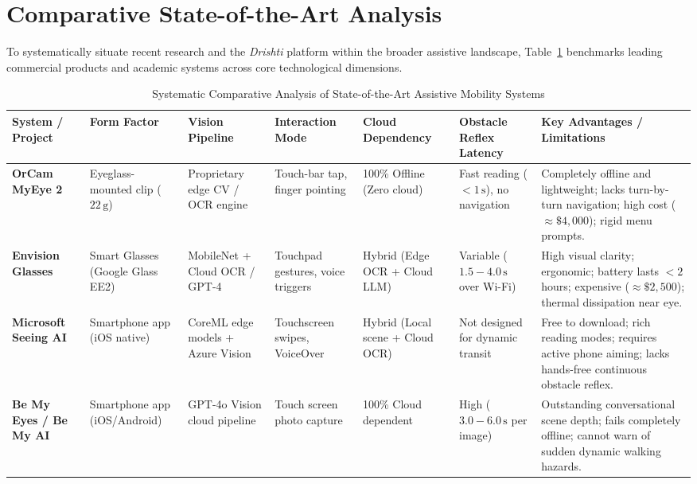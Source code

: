 \documentclass[10pt,twocolumn]{article}
\begin{document}
\section{Comparative State-of-the-Art Analysis}
\label{sec:comparative}

To systematically situate recent research and the \textit{Drishti} platform within the broader assistive landscape, Table~\ref{tab:comparison} benchmarks leading commercial products and academic systems across core technological dimensions.

\begin{table}[t]
\centering
\small
\caption{Systematic Comparative Analysis of State-of-the-Art Assistive Mobility Systems}
\label{tab:comparison}
\begin{tabularx}{\textwidth}{l p{2.2cm} p{2.0cm} p{2.0cm} p{2.2cm} p{2.4cm} X}
\toprule
\textbf{System / Project} & \textbf{Form Factor} & \textbf{Vision Pipeline} & \textbf{Interaction Mode} & \textbf{Cloud Dependency} & \textbf{Obstacle Reflex Latency} & \textbf{Key Advantages / Limitations} \\
\midrule
\textbf{OrCam MyEye 2} \cite{orcam2020} & Eyeglass-mounted clip ($22\,\text{g}$) & Proprietary edge CV / OCR engine & Touch-bar tap, finger pointing & 100\% Offline (Zero cloud) & Fast reading ($<1\,\text{s}$), no navigation & Completely offline and lightweight; lacks turn-by-turn navigation; high cost ($\approx \$4,000$); rigid menu prompts. \\
\addlinespace
\textbf{Envision Glasses} \cite{envision2023} & Smart Glasses (Google Glass EE2) & MobileNet + Cloud OCR / GPT-4 & Touchpad gestures, voice triggers & Hybrid (Edge OCR + Cloud LLM) & Variable ($1.5 - 4.0\,\text{s}$ over Wi-Fi) & High visual clarity; ergonomic; battery lasts $<2$ hours; expensive ($\approx \$2,500$); thermal dissipation near eye. \\
\addlinespace
\textbf{Microsoft Seeing AI} \cite{microsoft_seeing_ai} & Smartphone app (iOS native) & CoreML edge models + Azure Vision & Touchscreen swipes, VoiceOver & Hybrid (Local scene + Cloud OCR) & Not designed for dynamic transit & Free to download; rich reading modes; requires active phone aiming; lacks hands-free continuous obstacle reflex. \\
\addlinespace
\textbf{Be My Eyes / Be My AI} \cite{bemyeyes2023} & Smartphone app (iOS/Android) & GPT-4o Vision cloud pipeline & Touch screen photo capture & 100\% Cloud dependent & High ($3.0 - 6.0\,\text{s}$ per image) & Outstanding conversational scene depth; fails completely offline; cannot warn of sudden dynamic walking hazards. \\

\end{tabularx}
\end{table}
\end{document}
